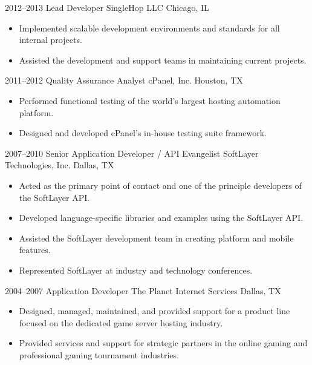\documentclass[11pt,a4paper,sans]{moderncv}
\begin{document}
        \cventry
            {2012--2013}
            {Lead Developer}
            {SingleHop LLC}
            {Chicago, IL}
            {}
            {
                \begin{itemize}
                    \item Implemented scalable development environments and standards for all internal projects.
                    \item Assisted the development and support teams in maintaining current projects.
                \end{itemize}
            }

        \cventry
            {2011--2012}
            {Quality Assurance Analyst}
            {cPanel, Inc.}
            {Houston, TX}
            {}
            {
                \begin{itemize}
                    \item Performed functional testing of the world's largest hosting automation platform.
                    \item Designed and developed cPanel's in-house testing suite framework.
                \end{itemize}
            }

        \cventry
            {2007--2010}
            {Senior Application Developer / API Evangelist}
            {SoftLayer Technologies, Inc.}
            {Dallas, TX}
            {}
            {
                \begin{itemize}
                    \item Acted as the primary point of contact and one of the principle developers of the SoftLayer API.
                    \item Developed language-specific libraries and examples using the SoftLayer API.
                    \item Assisted the SoftLayer development team in creating platform and mobile features.
                    \item Represented SoftLayer at industry and technology conferences.
                \end{itemize}
            }

        \cventry
            {2004--2007}
            {Application Developer}
            {The Planet Internet Services}
            {Dallas, TX}
            {}
            {
                \begin{itemize}
                    \item Designed, managed, maintained, and provided support for a product line focused on the dedicated game server hosting industry.
                    \item Provided services and support for strategic partners in the online gaming and professional gaming tournament industries.
                \end{itemize}
            }
\end{document}
